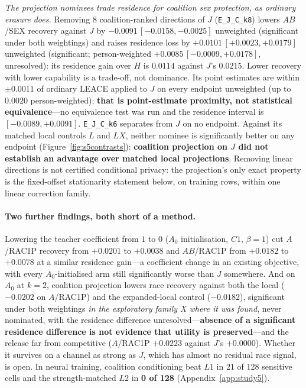 \documentclass[10pt]{article}
\begin{document}
\emph{The projection nominees trade residence for coalition sex protection, as ordinary erasure does.}
Removing 8 coalition-ranked directions of $J$ (\texttt{E\_J\_C\_k8}) lowers $AB$/SEX recovery against $J$ by
$-0.0091\,[-0.0158,-0.0025]$ unweighted (significant under both weightings) and raises residence loss by
$+0.0101\,[+0.0023,+0.0179]$ unweighted (significant; person-weighted $+0.0085\,[-0.0009,+0.0178]$,
unresolved): its residence gain over $H$ is $0.0114$ against $J$'s $0.0215$. Lower recovery with lower
capability is a trade-off, not dominance. Its point estimates are within $\pm0.0011$ of ordinary LEACE
applied to $J$ on every endpoint unweighted (up to $0.0020$ person-weighted); \textbf{that is point-estimate
proximity, not statistical equivalence}---no equivalence test was run and the residence interval is
$[-0.0089,+0.0091]$. \texttt{E\_J\_C\_k6} separates from $J$ on no endpoint. Against its matched local
controls $L$ and $LX$, neither nominee is significantly better on any endpoint
(Figure~\ref{fig:s5contrasts}): \textbf{coalition projection on $J$ did not establish an advantage over matched
local projections}. Removing linear directions is not certified conditional privacy: the projection's only
exact property is the fixed-offset stationarity statement below, on training rows, within one linear
correction family.


\paragraph{Two further findings, both short of a method.} Lowering the teacher coefficient from $1$ to $0$
($A_0$ initialisation, $C1$, $\beta=1$) cut $A$/RAC1P recovery from $+0.0201$ to $+0.0038$ and $AB$/RAC1P from
$+0.0182$ to $+0.0078$ at a similar residence gain---a coefficient change in an existing objective, with every
$A_0$-initialised arm still significantly worse than $J$ somewhere. And on $A_0$ at $k=2$, coalition projection
lowers race recovery against both the local ($-0.0202$ on $A$/RAC1P) and the expanded-local control
($-0.0182$), significant under both weightings \emph{in the exploratory family X where it was found}, never
nominated, with the residence difference unresolved---\textbf{absence of a significant residence difference is
not evidence that utility is preserved}---and the release far from competitive ($A$/RAC1P $+0.0223$ against
$J$'s $+0.0000$). Whether it survives on a channel as strong as $J$, which has almost no residual race signal,
is open. In neural training, coalition conditioning beat $L1$ in 21 of 128 sensitive cells and the
strength-matched $L2$ in \textbf{0 of 128} (Appendix~\ref{app:study5}).
\end{document}
